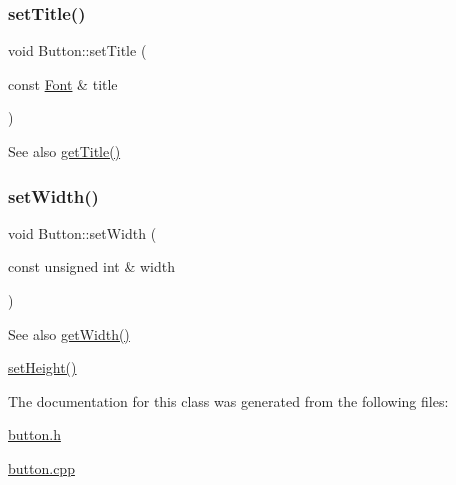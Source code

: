 \subsubsection{\texorpdfstring{set\+Title()}{setTitle()}}
{\footnotesize\ttfamily void Button\+::set\+Title (\begin{DoxyParamCaption}\item[{const \mbox{\hyperlink{class_font}{Font}} \&}]{title }\end{DoxyParamCaption})\hspace{0.3cm}{\ttfamily [virtual]}}

\begin{DoxySeeAlso}{See also}
\mbox{\hyperlink{class_button_afd5d30f0dc6aba866c45072c59ee06f8}{get\+Title()}} 
\end{DoxySeeAlso}
\mbox{\label{class_button_a77d90f51ba19a275e9d662cbb081049f}} 
\subsubsection{\texorpdfstring{set\+Width()}{setWidth()}}
{\footnotesize\ttfamily void Button\+::set\+Width (\begin{DoxyParamCaption}\item[{const unsigned int \&}]{width }\end{DoxyParamCaption})\hspace{0.3cm}{\ttfamily [virtual]}}

\begin{DoxySeeAlso}{See also}
\mbox{\hyperlink{class_button_a75acf94e1d23db5a64830c8ea7280c0a}{get\+Width()}} 

\mbox{\hyperlink{class_button_a6b048681f073eae03631251ddee96b17}{set\+Height()}} 
\end{DoxySeeAlso}


The documentation for this class was generated from the following files\+:\begin{DoxyCompactItemize}
\item 
\mbox{\hyperlink{button_8h}{button.\+h}}\item 
\mbox{\hyperlink{button_8cpp}{button.\+cpp}}\end{DoxyCompactItemize}
